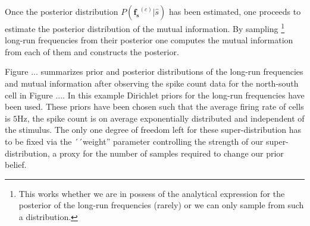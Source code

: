 Once the posterior distribution $P(\mathbf{f_s}^{(c)}\vert\hat{s})$ has been estimated, one proceeds to estimate the posterior distribution of the mutual information. By sampling \footnote{This works whether we are in possess of the analytical expression for the posterior of the long-run frequencies (rarely) or we can only sample from such a distribution.} long-run frequencies from their posterior one computes the mutual information from each of them and constructs the posterior.  

Figure ... summarizes prior and posterior distributions of the long-run frequencies and mutual information after observing the spike count data for the north-south cell in Figure .... In this example Dirichlet priors for the long-run frequencies have been used. These priors have been chosen such that the average firing rate of cells is $5$Hz, the spike count is on average exponentially distributed and independent of the stimulus. The only one degree of freedom left for these super-distribution has to be fixed via the ´´weight'' parameter controlling the strength of our super-distribution, a proxy for the number of samples required to change our prior belief. 



